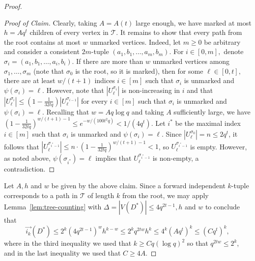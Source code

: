 \documentclass{article}
\theoremstyle{plain}
\theoremstyle{definition}
\newcommand{\cT}{\mathcal{T}}
\newcommand{\fwi}[1]{\overrightarrow{i_{#1}}}
\begin{document}
\begin{proof}
\begin{proof}[Proof of Claim]
        Clearly, taking $A = A(t)$ large enough, we have marked at most $h = A q^t$ children of every vertex in $\cT$. It remains to show that every path from the root contains at most $w$ unmarked vertices. Indeed, let $m \ge 0$ be arbitrary and consider a consistent $2m$-tuple $(a_1, b_1, \dots, a_m, b_m)$. For $i \in [0, m],$ denote $\sigma_i = (a_1, b_1, \dots, a_i, b_i)$. If there are more than $w$ unmarked vertices among $\sigma_1, \dots, \sigma_m$ (note that $\sigma_0$ is the root, so it is marked), then for some $\ell \in [0, t],$ there are at least $w / (t+1)$ indices $i \in [m]$ such that $\sigma_i$ is unmarked and $\psi(\sigma_i) = \ell$. However, note that $|U_\ell^{\sigma_i}|$ is non-increasing in $i$ and that $|U_{\ell}^{\sigma_i}| \le (1 - \frac{1}{32tq}) |U_{\ell}^{\sigma_{i-1}}|$ for every $i \in [m]$ such that $\sigma_i$ is unmarked and $\psi(\sigma_i) = \ell$. Recalling that $w = A q \log q$ and taking $A$ sufficiently large, we have $(1 - \frac{1}{32tq})^{w / (t+1) - 1} \le e^{-w / (100 t^2q) } < 1 / (4q^t)$. Let $i^*$ be the maximal index $i \in [m]$ such that $\sigma_i$ is unmarked and $\psi(\sigma_i) = \ell$. Since $|U_{\ell}^{\sigma_0}| = n \le 2q^t$, it follows that $|U_\ell^{\sigma_{i^*-1}}| \le n \cdot (1 - \frac{1}{32tq})^{w / (t+1) - 1} < 1$, so $U_\ell^{\sigma_{i^*-1}}$ is empty. However, as noted above, $\psi(\sigma_{i^*}) = \ell$ implies that $U_\ell^{\sigma_{i^*-1}}$ is non-empty, a contradiction.
    \end{proof}
    Let $A, h$ and $w$ be given by the above claim. Since a forward independent $k$-tuple corresponds to a path in $\cT$ of length $k$ from the root, we may apply Lemma~\ref{lem:tree-counting} with $\Delta = |V(D^*)| \le 4 q^{2t-1}, h$ and $w$ to conclude that
    \[ \fwi{k}(D^*) \le 2^k (4 q^{2t-1})^w h^{k-w} \le 2^k q^{2tw} h^k \le 4^k (A q^t)^k \le (C q^t)^k, \]
    where in the third inequality we used that $k \ge C q (\log q)^2$ so that $q^{2tw} \le 2^k$, and in the last inequality we used that $C \ge 4A$.
\end{proof}
\end{document}
